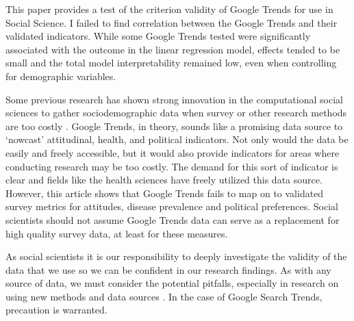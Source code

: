 This paper provides a test of the criterion validity of Google Trends for use in
Social Science. I failed to find correlation between the Google Trends and their
validated indicators. While some Google Trends tested were significantly
associated with the outcome in the linear regression model, effects tended to be
small and the total model interpretability remained low, even when
controlling for demographic variables.  

Some previous research has shown strong innovation in the computational social
sciences to gather sociodemographic data when survey or other research methods
are too costly \citep{blumenstockPredictingPovertyWealth2015}. Google Trends, in
theory, sounds like a promising data source to `nowcast' attitudinal, health,
and political indicators. Not only would the data be easily and freely
accessible, but it would also provide indicators for areas where conducting
research may be too costly. The demand for this sort of indicator is clear and
fields like the health sciences have freely utilized this data source. However,
this article shows that Google Trends fails to map on to validated survey
metrics for attitudes, disease prevalence and political preferences. Social
scientists should not assume Google Trends data can serve as a replacement for
high quality survey data, at least for these measures.

As social scientists it is our responsibility to deeply investigate the validity
of the data that we use so we can be confident in our research findings. As with
any source of data, we must consider the potential pitfalls, especially in
research on using new methods and data sources
\citep{mcfarlandBigDataDanger2015}. In the case of Google Search Trends,
precaution is warranted.

